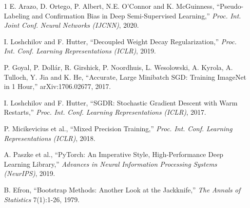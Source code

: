 \documentclass[twoside,a4paper,11pt]{article}
\begin{document}
\begin{thebibliography}{1}
E. Arazo, D. Ortego, P. Albert, N.E. O'Connor and K. McGuinness, ``Pseudo-Labeling and Confirmation Bias in Deep Semi-Supervised Learning,'' {\em Proc. Int. Joint Conf. Neural Networks (IJCNN)}, 2020.

I. Loshchilov and F. Hutter, ``Decoupled Weight Decay Regularization,'' {\em Proc. Int. Conf. Learning Representations (ICLR)}, 2019.

P. Goyal, P. Doll{\'a}r, R. Girshick, P. Noordhuis, L. Wesolowski, A. Kyrola, A. Tulloch, Y. Jia and K. He, ``Accurate, Large Minibatch {SGD}: Training {ImageNet} in 1 Hour,'' arXiv:1706.02677, 2017.

I. Loshchilov and F. Hutter, ``{SGDR}: Stochastic Gradient Descent with Warm Restarts,'' {\em Proc. Int. Conf. Learning Representations (ICLR)}, 2017.

P. Micikevicius et al., ``Mixed Precision Training,'' {\em Proc. Int. Conf. Learning Representations (ICLR)}, 2018.

A. Paszke et al., ``{PyTorch}: An Imperative Style, High-Performance Deep Learning Library,'' {\em Advances in Neural Information Processing Systems (NeurIPS)}, 2019.

B. Efron, ``Bootstrap Methods: Another Look at the Jackknife,'' {\em The Annals of Statistics} 7(1):1-26, 1979.

\end{thebibliography}
\end{document}
